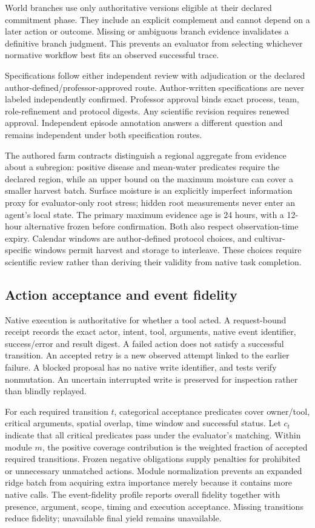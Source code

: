 \documentclass[sigconf,anonymous]{aamas}
\begin{document}
World branches use only authoritative versions eligible at their declared commitment phase. They include an explicit complement and cannot depend on a later action or outcome. Missing or ambiguous branch evidence invalidates a definitive branch judgment. This prevents an evaluator from selecting whichever normative workflow best fits an observed successful trace.

Specifications follow either independent review with adjudication or the declared author-defined/professor-approved route. Author-written specifications are never labeled independently confirmed. Professor approval binds exact process, team, role-refinement and protocol digests. Any scientific revision requires renewed approval. Independent episode annotation answers a different question and remains independent under both specification routes.

The authored farm contracts distinguish a regional aggregate from evidence about a subregion: positive disease and mean-water predicates require the declared region, while an upper bound on the maximum moisture can cover a smaller harvest batch. Surface moisture is an explicitly imperfect information proxy for evaluator-only root stress; hidden root measurements never enter an agent's local state. The primary maximum evidence age is 24 hours, with a 12-hour alternative frozen before confirmation. Both also respect observation-time expiry. Calendar windows are author-defined protocol choices, and cultivar-specific windows permit harvest and storage to interleave. These choices require scientific review rather than deriving their validity from native task completion.

\subsection{Action acceptance and event fidelity}
Native execution is authoritative for whether a tool acted. A request-bound receipt records the exact actor, intent, tool, arguments, native event identifier, success/error and result digest. A failed action does not satisfy a successful transition. An accepted retry is a new observed attempt linked to the earlier failure. A blocked proposal has no native write identifier, and tests verify nonmutation. An uncertain interrupted write is preserved for inspection rather than blindly replayed.

For each required transition $t$, categorical acceptance predicates cover owner/tool, critical arguments, spatial overlap, time window and successful status. Let $c_t$ indicate that all critical predicates pass under the evaluator's matching. Within module $m$, the positive coverage contribution is the weighted fraction of accepted required transitions. Frozen negative obligations supply penalties for prohibited or unnecessary unmatched actions. Module normalization prevents an expanded ridge batch from acquiring extra importance merely because it contains more native calls. The event-fidelity profile reports overall fidelity together with presence, argument, scope, timing and execution acceptance. Missing transitions reduce fidelity; unavailable final yield remains unavailable.
\end{document}
